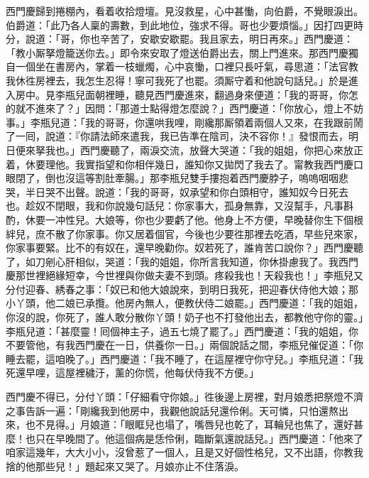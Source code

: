 西門慶歸到捲棚內，看着收拾燈壇。見沒救星，心中甚慟，向伯爵，不覺眼淚出。伯爵道：「此乃各人稟的壽數，到此地位，強求不得。哥也少要煩惱。」因打四更時分，說道：「哥，你也辛苦了，安歇安歇罷。我且家去，明日再來。」西門慶道：「教小厮拏燈籠送你去。」即令來安取了燈送伯爵出去，關上門進來。那西門慶獨自一個坐在書房內，掌着一枝蠟燭，心中哀慟，口裡只長吁氣，尋思道：「法官教我休徃房裡去，我怎生忍得！寧可我死了也罷。須厮守着和他說句話兒。」{}於是進入房中。見李瓶兒面朝裡睡，聽見西門慶進來，翻過身來便道：「我的哥哥，你怎的就不進來了？」{}因問：「那道士點得燈怎麼說？」西門慶道：「你放心，燈上不妨事。」李瓶兒道：「我的哥哥，你還哄我哩，剛纔那厮領着兩個人又來，在我跟前鬧了一囘，說道：『你請法師來遣我，我已告準在陰司，決不容你！』發恨而去，明日便來拏我也。」西門慶聽了，兩淚交流，{}放聲大哭道：「我的姐姐，你把心來放正着，休要理他。我實指望和你相伴幾日，誰知你又拋閃了我去了。甯教我西門慶口眼閉了，倒也沒這等割肚牽腸。」那李瓶兒雙手摟抱着西門慶脖子，嗚嗚咽咽悲哭，半日哭不出聲。說道：「我的哥哥，奴承望和你白頭相守，誰知奴今日死去也。趁奴不閉眼，我和你說幾句話兒：你家事大，孤身無靠，又沒幫手，凡事斟酌，休要一冲性兒。大娘等，你也少要虧了他。{}他身上不方便，早晚替你生下個根絆兒，庶不散了你家事。你又居着個官，今後也少要徃那裡去吃酒，早些兒來家，你家事要緊。比不的有奴在，還早晚勸你。奴若死了，誰肯苦口說你？」{}西門慶聽了，如刀剜心肝相似，哭道：「我的姐姐，你所言我知道，你休掛慮我了。我西門慶那世裡絕緣短幸，今世裡與你做夫妻不到頭。疼殺我也！天殺我也！」李瓶兒又分付迎春、綉春之事：「奴已和他大娘說來，到明日我死，把迎春伏侍他大娘；那小丫頭，他二娘已承攬。他房內無人，便教伏侍二娘罷。」西門慶道：「我的姐姐，你沒的說，你死了，誰人敢分散你丫頭！奶子也不打發他出去，都教他守你的靈。」李瓶兒道：「甚麼靈！囘個神主子，過五七燒了罷了。」西門慶道：「我的姐姐，你不要管他，有我西門慶在一日，供養你一日。」兩個說話之間，李瓶兒催促道：「你睡去罷，這咱晚了。」西門慶道：「我不睡了，在這屋裡守你守兒。」李瓶兒道：「我死還早哩，這屋裡穢汙，薰的你慌，他每伏侍我不方便。」

西門慶不得已，分付丫頭：「仔細看守你娘。」徃後邊上房裡，對月娘悉把祭燈不濟之事告訴一遍：「剛纔我到他房中，我觀他說話兒還伶俐。天可憐，只怕還熬出來，也不見得。」{}月娘道：「眼眶兒也塌了，嘴唇兒也乾了，耳輪兒也焦了，還好甚麼！也只在早晚間了。他這個病是恁伶俐，臨斷氣還說話兒。」西門慶道：「他來了咱家這幾年，大大小小，沒曾惹了一個人，且是又好個性格兒，{}{}又不出語，你教我捨的他那些兒！」題起來又哭了。月娘亦止不住落淚。

